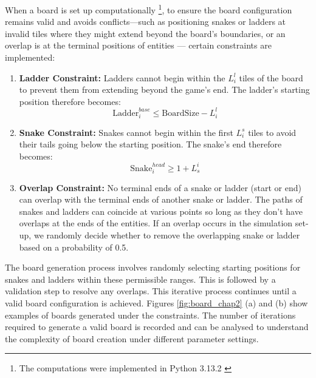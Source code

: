 When a board is set up computationally \footnote{The computations were implemented in Python 3.13.2 \autocite{python}}, to ensure the board configuration remains valid and avoids conflicts—such as positioning snakes or ladders at invalid tiles where they might extend beyond the board's boundaries, or an overlap is at the terminal positions of entities — certain constraints are implemented:

\begin{enumerate}
	\item \textbf{Ladder Constraint:} Ladders cannot begin within the $L^{l}_{i}$ tiles of the board to prevent them from extending beyond the game's end. The ladder's starting position therefore becomes:  $$\text{Ladder}^{base}_{i} \leq \text{BoardSize} - L^{l}_{i}$$\linebreak
	\item \textbf{Snake Constraint:} Snakes cannot begin within the first $L^{s}_{i}$ tiles to avoid their tails going below the starting position. The snake's end therefore becomes: $$\text{Snake}^{head}_{i}\geq 1 + L^{i}_{s}$$
	\item \textbf{Overlap Constraint:} No terminal ends of a snake or ladder (start or end) can overlap with the terminal ends of another snake or ladder. The paths of snakes and ladders can coincide at various points so long as they don't have overlaps at the ends of the entities. If an overlap occurs in the simulation set-up, we randomly decide whether to remove the overlapping snake or ladder based on a probability of 0.5.
\end{enumerate}

The board generation process involves randomly selecting starting positions for snakes and ladders within these permissible ranges. This is followed by a validation step to resolve any overlaps. This iterative process continues until a valid board configuration is achieved. Figures \ref{fig:board_chap2} (a) and (b) show examples of boards generated under the constraints. The number of iterations required to generate a valid board is recorded and can be analysed to understand the complexity of board creation under different parameter settings.

